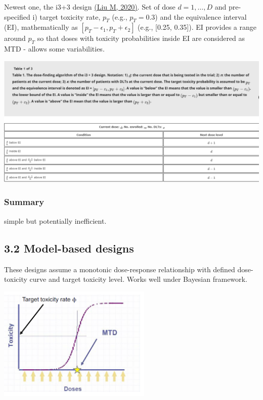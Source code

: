 \documentclass[
]{article}
\begin{document}
Newest one, the i3+3 design
\href{https://www.tandfonline.com/doi/abs/10.1080/10543406.2019.1636811?journalCode=lbps20}{(Liu
M, 2020)}. Set of dose \(d=1, \ldots, D\) and pre-specified i) target
toxicity rate, \(p_T\) (e.g., \(p_T=0.3\)) and the equivalence interval
(EI), mathematically as \([p_T - \epsilon_1, p_T + \epsilon_2]\) (e.g.,
{[}0.25, 0.35{]}). EI provides a range around \(p_T\) so that doses with
toxicity probabilities inside EI are considered as MTD - allows some
variabilities.

\includegraphics[width=1.1\textwidth,height=\textheight]{Figurei33.PNG}

\hypertarget{summary}{%
\subsubsection{Summary}\label{summary}}

simple but potentially inefficient.

\hypertarget{model-based-designs}{%
\subsection{3.2 Model-based designs}\label{model-based-designs}}

These designs assume a monotonic dose-response relationship with defined
dose-toxicity curve and target toxicity level. Works well under Bayesian
framework.

\includegraphics[width=0.55\textwidth,height=\textheight]{Figure3.1_sub.PNG}
\end{document}
